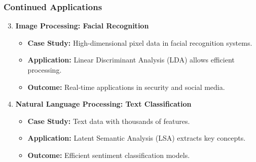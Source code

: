 \documentclass[aspectratio=169]{beamer}
\begin{document}
\begin{frame}[fragile]
    \frametitle{Continued Applications}
    \begin{enumerate}
        \setcounter{enumi}{2}
        \item \textbf{Image Processing: Facial Recognition}
            \begin{itemize}
                \item \textbf{Case Study:} High-dimensional pixel data in facial recognition systems.
                \item \textbf{Application:} Linear Discriminant Analysis (LDA) allows efficient processing.
                \item \textbf{Outcome:} Real-time applications in security and social media.
            \end{itemize}

        \item \textbf{Natural Language Processing: Text Classification}
            \begin{itemize}
                \item \textbf{Case Study:} Text data with thousands of features.
                \item \textbf{Application:} Latent Semantic Analysis (LSA) extracts key concepts.
                \item \textbf{Outcome:} Efficient sentiment classification models.
            \end{itemize}
    \end{enumerate}
\end{frame}
\end{document}
